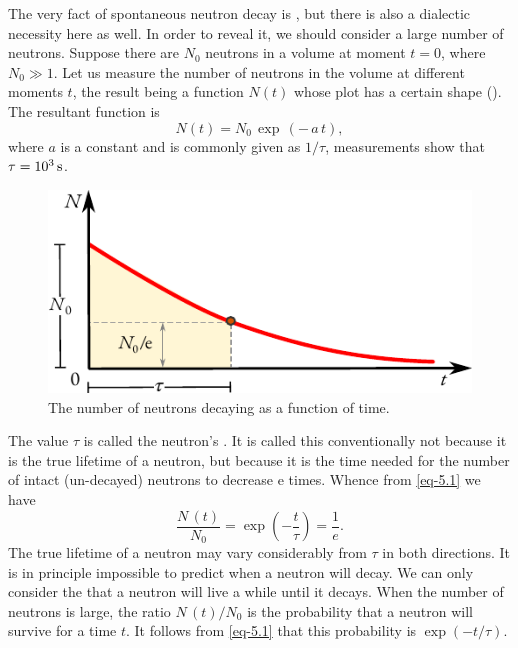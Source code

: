 The very fact of spontaneous neutron decay is , but there is
also a dialectic necessity here as well. In order to reveal it, we should
consider a large number of neutrons. Suppose there are $N_{0}$ neutrons in a volume at moment $t = 0$, where $N_{0} \gg 1$. Let us measure the number of neutrons in the volume at different moments $t$, the result being a function $N (t)$ whose plot has a certain shape (). The resultant
function is
\begin{equation}%
N(t) = N_{0} \, \exp \, ( - \,a \,t),
\label{eq-5.1}
\end{equation}
where $a$ is a constant and is commonly given as $1/\tau$, measurements
show that $\tau = \SI{d3}{\second}$.

\begin{figure}[!ht]
\centering
\includegraphics[width=0.75\tfwidth]{figures/decay.pdf}
\caption{The number of neutrons decaying as a function of time.\label{decay-fn}}
\end{figure}

The value $\tau$ is called the neutron's . It is called this
conventionally not because it is the true lifetime of a neutron, but
because it is the time needed for the number of intact (un-decayed)
neutrons to decrease e times. Whence from \eqref{eq-5.1} we have 
\begin{equation*}
\frac{N\,(t)}{N_{0}} = \exp \left( -\frac{t}{\tau} \right) = \frac{1}{e}.
\end{equation*}
The true lifetime of a neutron may vary considerably from
$\tau$ in both directions. It is in principle impossible to predict when
a neutron will decay. We can only consider the  that
a neutron will live a while until it decays. When the number of neutrons
is large, the ratio $N\, (t) / N_{0}$ is the probability that a neutron will survive for a time $t$. It follows from \eqref{eq-5.1} that this probability is $\exp (-t / \tau)$.


